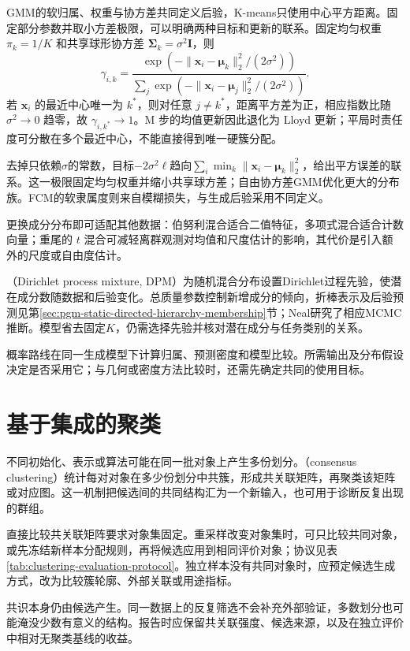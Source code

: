 GMM的软归属、权重与协方差共同定义后验，K-means只使用中心平方距离。固定部分参数并取小方差极限，可以明确两种目标和更新的联系。固定均匀权重 $\pi_k=1/K$ 和共享球形协方差 $\bm{\Sigma}_k=\sigma^2\bm{I}$，则
\[
 \gamma_{i,k}=
 \frac{\exp(-\lVert\bm{x}_i-\bm{\mu}_k\rVert_2^2/(2\sigma^2))}
 {\sum_j\exp(-\lVert\bm{x}_i-\bm{\mu}_j\rVert_2^2/(2\sigma^2))}.
\]
若 $\bm{x}_i$ 的最近中心唯一为 $k^\ast$，则对任意 $j\ne k^\ast$，距离平方差为正，相应指数比随 $\sigma^2\to0$ 趋零，故 $\gamma_{i,k^\ast}\to1$。M 步的均值更新因此退化为 Lloyd 更新；平局时责任度可分散在多个最近中心，不能直接得到唯一硬簇分配。

去掉只依赖$\sigma$的常数，目标$-2\sigma^2\ell$趋向$\sum_i\min_k\lVert\bm{x}_i-\bm{\mu}_k\rVert_2^2$，给出平方误差的联系。这一极限固定均匀权重并缩小共享球方差；自由协方差GMM优化更大的分布族。FCM的软隶属度则来自模糊损失，与生成后验采用不同定义。

更换成分分布即可适配其他数据：伯努利混合适合二值特征，多项式混合适合计数向量；重尾的 $t$ 混合可减轻离群观测对均值和尺度估计的影响，其代价是引入额外的尺度或自由度估计。

（Dirichlet process mixture, DPM）为随机混合分布设置Dirichlet过程先验，使潜在成分数随数据和后验变化。总质量参数控制新增成分的倾向，折棒表示及后验预测见第\ref{sec:pgm-static-directed-hierarchy-membership}节；Neal研究了相应MCMC推断。模型省去固定$K$，仍需选择先验并核对潜在成分与任务类别的关系。

概率路线在同一生成模型下计算归属、预测密度和模型比较。所需输出及分布假设决定是否采用它；与几何或密度方法比较时，还需先确定共同的使用目标。

\section{基于集成的聚类}
\label{sec:clustering-ensemble}

不同初始化、表示或算法可能在同一批对象上产生多份划分。（consensus clustering）统计每对对象在多少份划分中共簇，形成共关联矩阵，再聚类该矩阵或对应图。这一机制把候选间的共同结构汇为一个新输入，也可用于诊断反复出现的群组。

直接比较共关联矩阵要求对象集固定。重采样改变对象集时，可只比较共同对象，或先冻结新样本分配规则，再将候选应用到相同评价对象；协议见表\ref{tab:clustering-evaluation-protocol}。独立样本没有共同对象时，应预定候选生成方式，改为比较簇轮廓、外部关联或用途指标。

共识本身仍由候选产生。同一数据上的反复筛选不会补充外部验证，多数划分也可能淹没少数有意义的结构。报告时应保留共关联强度、候选来源，以及在独立评价中相对无聚类基线的收益。

